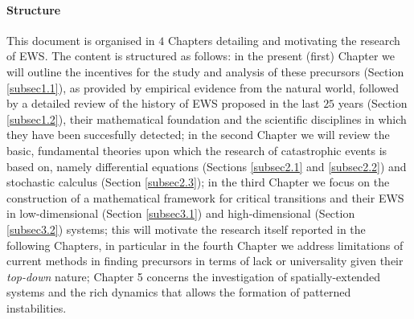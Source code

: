 \documentclass[../main.tex]{subfiles}
\begin{document}
\paragraph{Structure}
This document is organised in $4$ Chapters detailing and motivating the research of EWS. 
The content is structured as follows: in the present (first) Chapter we will outline the incentives for the study and analysis of these precursors (Section \ref{subsec1.1}), as provided by empirical evidence from the natural world, followed by a detailed review of the history of EWS proposed in the last $25$ years (Section \ref{subsec1.2}), their mathematical foundation and the scientific disciplines in which they have been succesfully detected; 
in the second Chapter we will review the basic, fundamental theories upon which the research of catastrophic events is based on, namely differential equations (Sections \ref{subsec2.1} and \ref{subsec2.2}) and stochastic calculus (Section \ref{subsec2.3});
in the third Chapter we focus on the construction of a mathematical framework for critical transitions and their EWS in low-dimensional (Section \ref{subsec3.1}) and high-dimensional (Section \ref{subsec3.2}) systems; 
this will motivate the research itself reported in the following Chapters, in particular in the fourth Chapter we address limitations of current methods in finding precursors in terms of lack or universality given their \textit{top-down} nature;
Chapter 5 concerns the investigation of spatially-extended systems and the rich dynamics that allows the formation of patterned instabilities.


\end{document}
